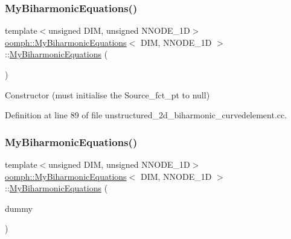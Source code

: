 \subsubsection{\texorpdfstring{My\+Biharmonic\+Equations()}{MyBiharmonicEquations()}\hspace{0.1cm}{\footnotesize\ttfamily [3/4]}}
{\footnotesize\ttfamily template$<$unsigned D\+IM, unsigned N\+N\+O\+D\+E\+\_\+1D$>$ \\
\hyperlink{classoomph_1_1MyBiharmonicEquations}{oomph\+::\+My\+Biharmonic\+Equations}$<$ D\+IM, N\+N\+O\+D\+E\+\_\+1D $>$\+::\hyperlink{classoomph_1_1MyBiharmonicEquations}{My\+Biharmonic\+Equations} (\begin{DoxyParamCaption}{ }\end{DoxyParamCaption})\hspace{0.3cm}{\ttfamily [inline]}}



Constructor (must initialise the Source\+\_\+fct\+\_\+pt to null) 



Definition at line 89 of file unstructured\+\_\+2d\+\_\+biharmonic\+\_\+curvedelement.\+cc.

\mbox{\label{classoomph_1_1MyBiharmonicEquations_a3cf0e0a63e46219b94195aa4ab926316}} 
\subsubsection{\texorpdfstring{My\+Biharmonic\+Equations()}{MyBiharmonicEquations()}\hspace{0.1cm}{\footnotesize\ttfamily [4/4]}}
{\footnotesize\ttfamily template$<$unsigned D\+IM, unsigned N\+N\+O\+D\+E\+\_\+1D$>$ \\
\hyperlink{classoomph_1_1MyBiharmonicEquations}{oomph\+::\+My\+Biharmonic\+Equations}$<$ D\+IM, N\+N\+O\+D\+E\+\_\+1D $>$\+::\hyperlink{classoomph_1_1MyBiharmonicEquations}{My\+Biharmonic\+Equations} (\begin{DoxyParamCaption}\item[{const \hyperlink{classoomph_1_1MyBiharmonicEquations}{My\+Biharmonic\+Equations}$<$ D\+IM, N\+N\+O\+D\+E\+\_\+1D $>$ \&}]{dummy }\end{DoxyParamCaption})\hspace{0.3cm}{\ttfamily [inline]}}



